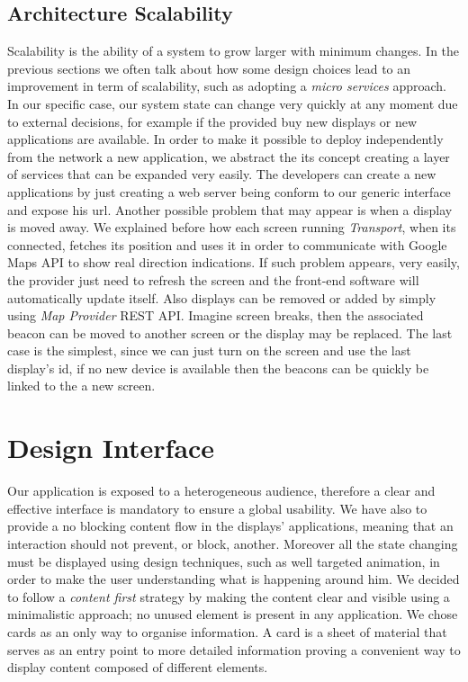 \documentclass[]{usiinfbachelorproject}
\begin{document}
\subsection{Architecture Scalability}
Scalability is the ability of a system to grow larger with minimum changes. In the previous sections we often talk about how some design choices lead to an improvement in term of scalability, such as adopting a \emph{micro services} approach. In our specific case, our system state can change very quickly at any moment due to external decisions, for example if the provided buy new displays or new applications are available.
In order to make it possible to deploy independently from the network a new application, we abstract the its concept creating a layer of services that can be expanded very easily. The developers can create a new applications by just creating a web server being conform to our generic interface and expose his url.
Another possible problem that may appear is when a display is moved away. We explained before how each screen running \emph{Transport}, when its connected, fetches its position and uses it in order to communicate with Google Maps API to show real direction indications. If such problem appears, very easily, the provider just need to refresh the screen and the front-end software will automatically update itself.
Also displays can be removed or added by simply using \emph{Map Provider} REST API. Imagine screen breaks, then the associated beacon can be moved to another screen or the display may be replaced. The last case is the simplest, since we can just turn on the screen and use the last display's id, if no new device is available then the beacons can be quickly be linked to the a new screen.
\section{Design Interface}
Our application is exposed to a heterogeneous audience, therefore a clear and effective interface is mandatory to ensure a global usability. 
We have also to provide a no blocking content flow in the displays' applications, meaning that an interaction should not prevent, or block, another.
Moreover all the state changing must be displayed using design techniques, such as well targeted animation, in order to make the user understanding what is happening around him.
We decided to follow a \emph{content first} strategy by making the content clear and visible using a minimalistic approach; no unused element is present in any application. We chose cards as an only way to organise information. A card is a sheet of material that serves as an entry point to more detailed information proving a convenient way to display content composed of different elements.
\end{document}
